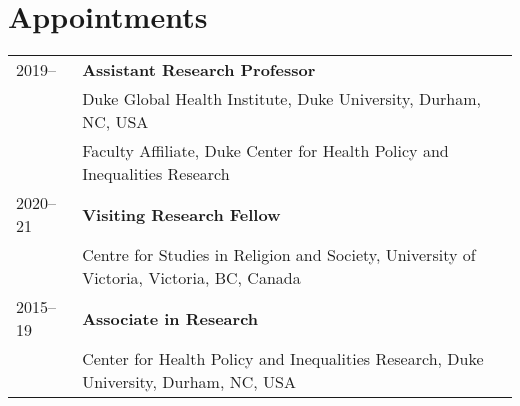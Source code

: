 \vspace{3ex}
\section*{Appointments}
\begin{longtable}{p{} p{}}
2019-- & \textbf{Assistant Research Professor}\\
		             & Duke Global Health Institute, Duke University, Durham, NC, USA \\
		             & Faculty Affiliate, Duke Center for Health Policy and Inequalities Research\\
2020--21 & \textbf{Visiting Research Fellow}\\
	& Centre for Studies in Religion and Society, University of Victoria, Victoria, BC, Canada \\
	2015--19 & \textbf{Associate in Research}\\
	& Center for Health Policy and Inequalities Research, Duke University, Durham, NC, USA \\
\end{longtable}